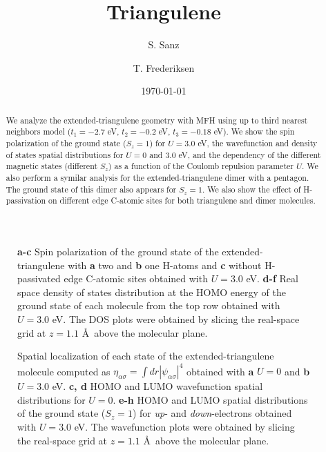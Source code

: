 \documentclass[twocolumn,amsmath,%
amssymb,prb,superscriptaddress]{revtex4}
\begin{document}
\title{Triangulene}

\author{S. Sanz}

\author{T. Frederiksen}

\date{\today}

\begin{abstract}
We analyze the extended-triangulene geometry with MFH using up to third nearest neighbors model ($t_{1}=-2.7$ eV, $t_{2}=-0.2$ eV, $t_{3}=-0.18$ eV). We show the spin polarization of the ground state ($S_{z}=1$) for $ U=3.0$ eV, the wavefunction and density of states spatial distributions for $U=0$ and $3.0$ eV, and the dependency of the different magnetic states (different $S_{z}$) as a function of the Coulomb repulsion parameter $U$. We also perform a symilar analysis for the extended-triangulene dimer with a pentagon. The ground state of this dimer also appears for $S_{z}=1$. We also show the effect of H-passivation on different edge C-atomic sites for both triangulene and dimer molecules.
\end{abstract}

\maketitle

\begin{figure*}
	\scalebox{.6}{}
	\caption{\textbf{a-c} Spin polarization of the ground state of the extended-triangulene with \textbf{a} two and \textbf{b} one H-atoms and \textbf{c} without H-passivated edge C-atomic sites obtained with $U=3.0$ eV. \textbf{d-f} Real space density of states distribution at the HOMO energy of the ground state of each molecule from the top row obtained with $U=3.0$ eV. The DOS plots were obtained by slicing the real-space grid at $z=1.1$ \AA \ above the molecular plane.}
\end{figure*}

\begin{figure*}
	\scalebox{.7}{}
	\caption{Spatial localization of each state of the extended-triangulene molecule computed as $\eta_{\alpha\sigma}=\int dr|\psi_{\alpha\sigma}|^{4}$ obtained with \textbf{a} $U=0$ and \textbf{b} $U=3.0$ eV. \textbf{c, d} HOMO and LUMO wavefunction spatial distributions for $U=0$. \textbf{e-h} HOMO and LUMO spatial distributions of the ground state ($S_{z}=1$) for \emph{up}- and \emph{down}-electrons obtained with $U=3.0$ eV. The wavefunction plots were obtained by slicing the real-space grid at $z=1.1$ \AA \ above the molecular plane.}
\end{figure*}
\end{document}
